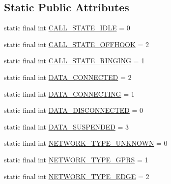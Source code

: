 \subsection*{Static Public Attributes}
\begin{DoxyCompactItemize}
\item 
static final int \hyperlink{interfacecom_1_1qualoutdoor_1_1recorder_1_1telephony_1_1ITelephony_ab2d6e4c2dd160412dda46b26763e8a64}{C\-A\-L\-L\-\_\-\-S\-T\-A\-T\-E\-\_\-\-I\-D\-L\-E} = 0
\item 
static final int \hyperlink{interfacecom_1_1qualoutdoor_1_1recorder_1_1telephony_1_1ITelephony_a2efb64f0209a5ae97c7cb331827c80a9}{C\-A\-L\-L\-\_\-\-S\-T\-A\-T\-E\-\_\-\-O\-F\-F\-H\-O\-O\-K} = 2
\item 
static final int \hyperlink{interfacecom_1_1qualoutdoor_1_1recorder_1_1telephony_1_1ITelephony_aea753bfaf3bdcab76c67409284bd3aab}{C\-A\-L\-L\-\_\-\-S\-T\-A\-T\-E\-\_\-\-R\-I\-N\-G\-I\-N\-G} = 1
\item 
static final int \hyperlink{interfacecom_1_1qualoutdoor_1_1recorder_1_1telephony_1_1ITelephony_a1d4417783954f4f1a82ade95bf2617b3}{D\-A\-T\-A\-\_\-\-C\-O\-N\-N\-E\-C\-T\-E\-D} = 2
\item 
static final int \hyperlink{interfacecom_1_1qualoutdoor_1_1recorder_1_1telephony_1_1ITelephony_a0fed369a5e327ef1100f8bb86ba8283e}{D\-A\-T\-A\-\_\-\-C\-O\-N\-N\-E\-C\-T\-I\-N\-G} = 1
\item 
static final int \hyperlink{interfacecom_1_1qualoutdoor_1_1recorder_1_1telephony_1_1ITelephony_a918bc00a6b832ab07926cf77626bbd24}{D\-A\-T\-A\-\_\-\-D\-I\-S\-C\-O\-N\-N\-E\-C\-T\-E\-D} = 0
\item 
static final int \hyperlink{interfacecom_1_1qualoutdoor_1_1recorder_1_1telephony_1_1ITelephony_adbd921850a2b4a6558f41dea27e861e0}{D\-A\-T\-A\-\_\-\-S\-U\-S\-P\-E\-N\-D\-E\-D} = 3
\item 
static final int \hyperlink{interfacecom_1_1qualoutdoor_1_1recorder_1_1telephony_1_1ITelephony_a673927b5b9f59f4adfdbbe8403dc3f75}{N\-E\-T\-W\-O\-R\-K\-\_\-\-T\-Y\-P\-E\-\_\-\-U\-N\-K\-N\-O\-W\-N} = 0
\item 
static final int \hyperlink{interfacecom_1_1qualoutdoor_1_1recorder_1_1telephony_1_1ITelephony_a370a400527daeffcf74e59bb8c25783f}{N\-E\-T\-W\-O\-R\-K\-\_\-\-T\-Y\-P\-E\-\_\-\-G\-P\-R\-S} = 1
\item 
static final int \hyperlink{interfacecom_1_1qualoutdoor_1_1recorder_1_1telephony_1_1ITelephony_a24b6cda1c698dedf417e58b3742acf02}{N\-E\-T\-W\-O\-R\-K\-\_\-\-T\-Y\-P\-E\-\_\-\-E\-D\-G\-E} = 2

\end{DoxyCompactItemize}
